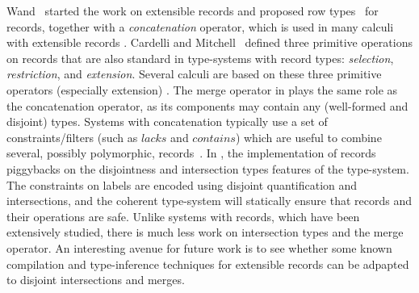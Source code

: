 Wand~\cite{wand1987complete} started the work on extensible records and proposed
row types~\cite{wand1989type} for records, together with a \emph{concatenation}
operator, which is used in many calculi with extensible records
\cite{harper1991record,remy1992typing,wand1989type,sulzmann97designing,makholm05type,pottier2003constraint}.
Cardelli and Mitchell~\cite{cardelli1990operations} defined three primitive operations on
records that are also standard in type-systems with record types: 
\emph{selection}, \emph{restriction}, and \emph{extension}. 
Several calculi are based on these three primitive operators (especially extension)
\cite{remy1993type,gaster1996polymorphic,jones99lightweight,leijen2004first,leijen2005extensible,blume2006extensible}.
The merge operator in \name plays the same role as the concatenation operator, as its components 
may contain any (well-formed and disjoint) types.
Systems with concatenation typically use a set of constraints/filters
(such as $lacks$ and $contains$) which are useful to combine several, possibly 
polymorphic, records~\cite{leijen2005extensible}.
In \name, the implementation of records piggybacks on the disjointness
and intersection types features of the type-system. The constraints on
labels are encoded using disjoint quantification and intersections,
and the coherent type-system will statically ensure that records and
their operations are safe. Unlike systems with records, which have
been extensively studied, there is much less work on intersection
types and the merge operator. An interesting avenue for future work is 
to see whether some known compilation and type-inference techniques
for extensible records can be adpapted to disjoint intersections and
merges.


